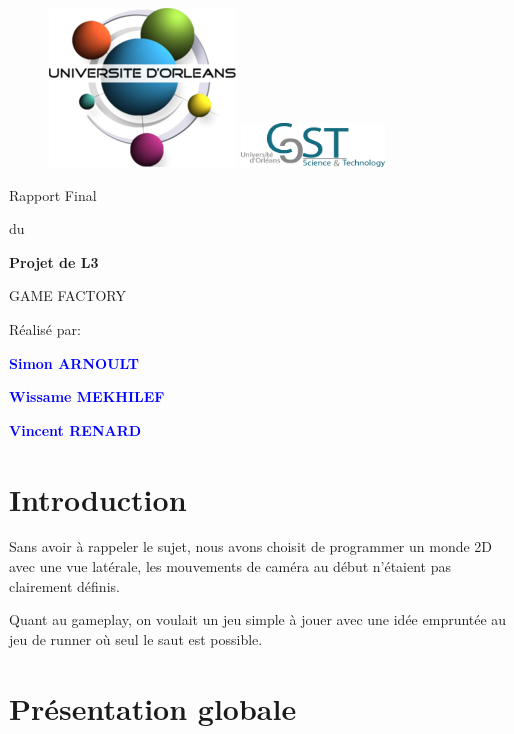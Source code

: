 \documentclass[french,12pt]{article}
\newcommand{\ml}[0]{\par\noindent}
\begin{document}
\thispagestyle{empty}
%
\begin{figure}[H]
\includegraphics[width=0.2\linewidth]{logo_univ.png}
\hfill
\includegraphics[width=1.5in]{logo_ufr.png}
\end{figure}
\vspace{2cm}
%
\begin{center}
{\Huge Rapport Final}
\par\vspace{0.4cm}
{\Large du}
\par\vspace{0.4cm}
{\Huge\bf Projet de L3}
\par\vspace{3cm}
{\Huge       GAME FACTORY}
\par\vspace{3cm}
{\Huge       Réalisé par:}

\par\vspace{0.3cm}
{\Huge\bf \textcolor{blue}{Simon ARNOULT}}
\par\vspace{0.3cm}
{\Huge\bf \textcolor{blue}{Wissame MEKHILEF}}
\par\vspace{0.3cm}
{\Huge\bf \textcolor{blue}{Vincent RENARD}}

\end{center}
\newpage
\tableofcontents
\newpage


\section{Introduction}

Sans avoir à rappeler le sujet, nous avons choisit de programmer un monde 2D avec une vue latérale, les mouvements de caméra au début n'étaient pas clairement définis.
\ml
Quant au gameplay, on voulait un jeu simple à jouer avec une idée empruntée au jeu de runner où seul le saut est possible.

\section{Présentation globale}

\end{document}
